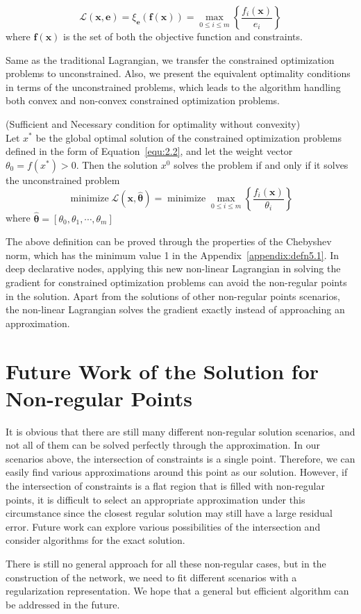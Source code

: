 \begin{equation}
    \label{equ:non-linear-lag}
    \mathcal{L}(\mathbf{x}, \mathbf{e})=\xi_{\mathbf{e}}(\mathbf{f}(\mathbf{x}))=\max _{0 \leq i \leq m}\left\{\frac{f_{i}(\mathbf{x})}{e_{i}}\right\}
\end{equation}
where $\mathbf{f}(\mathbf{x})$ is the set of both the objective function and constraints. 
\par Same as the traditional Lagrangian, we transfer the constrained optimization problems to unconstrained. Also, we present the equivalent optimality conditions in terms of the unconstrained problems, which leads to the algorithm handling both convex and non-convex constrained optimization problems. 
\begin{defn}{(Sufficient and Necessary condition for optimality without convexity)\cite{GC:97}}
    \label{defn:non-linear-condition}
    \\
    Let $x^*$ be the global optimal solution of the constrained optimization problems defined in the form of Equation~\ref{equ:2.2}, and let the weight vector $\theta_0 = f(x^*) > 0$. Then the solution $x^0$ solves the problem if and only if it solves the unconstrained problem
    $$
        \operatorname{minimize} \mathcal{L}(\mathbf{x}, \hat{\boldsymbol{\theta}}) = \operatorname{minimize} \max _{0 \leq i \leq m}\left\{\frac{f_{i}(\mathbf{x})}{\theta_{i}}\right\}
    $$
    where $\hat{\boldsymbol{\theta}}=\left[\theta_{0}, \theta_{1}, \cdots, \theta_{m}\right]$
\end{defn}
\par The above definition can be proved through the properties of the Chebyshev norm, which has the minimum value 1 in the Appendix~\ref{appendix:defn5.1}. In deep declarative nodes, applying this new non-linear Lagrangian in solving the gradient for constrained optimization problems can avoid the non-regular points in the solution. Apart from the solutions of other non-regular points scenarios, the non-linear Lagrangian solves the gradient exactly instead of approaching an approximation. 

\section{Future Work of the Solution for Non-regular Points}
\label{sec:futurework-non}
It is obvious that there are still many different non-regular solution scenarios, and not all of them can be solved perfectly through the approximation. In our scenarios above, the intersection of constraints is a single point. Therefore, we can easily find various approximations around this point as our solution. However, if the intersection of constraints is a flat region that is filled with non-regular points, it is difficult to select an appropriate approximation under this circumstance since the closest regular solution may still have a large residual error. Future work can explore various possibilities of the intersection and consider algorithms for the exact solution.
\par There is still no general approach for all these non-regular cases, but in the construction of the network, we need to fit different scenarios with a regularization representation. We hope that a general but efficient algorithm can be addressed in the future. 
